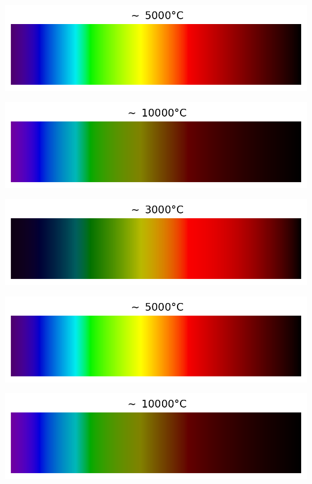 \documentclass[12pt,a4paper,fleqn]{article}
\begin{document}
\begin{landscape}
\begin{center}
\begin{multicols}{3}
\includegraphics[width=\linewidth]{images/spectrum_black_body_temp5000K.png}

\includegraphics[width=\linewidth]{images/spectrum_black_body_temp10000K.png}
\end{multicols}
\end{center}

\begin{center}
\begin{multicols}{3}
\includegraphics[width=\linewidth]{images/spectrum_black_body_temp3000K.png}

\includegraphics[width=\linewidth]{images/spectrum_black_body_temp5000K.png}

\includegraphics[width=\linewidth]{images/spectrum_black_body_temp10000K.png}
\end{multicols}
\end{center}


\end{landscape}
\end{document}

